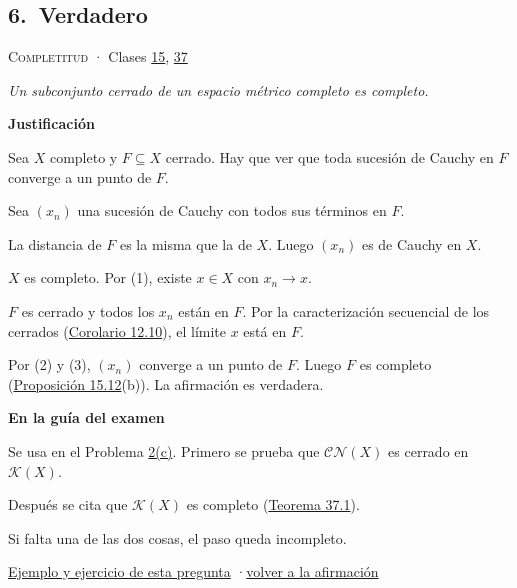 \documentclass[11pt,a4paper]{article}
\newcommand{\bloque}[1]{\par\smallskip\noindent\textbf{\color{acento}#1}\par}
\begin{document}
\subsection*{\hypertarget{r-6}{}6.\ \textcolor{ok}{Verdadero}}
{\small \textsc{Completitud} · Clases \href{https://decostruttivismo.github.io/MAT2514-repaso/pdf/MAT2514_apuntes_completos.pdf\#nameddest=section.15}{15}, \href{https://decostruttivismo.github.io/MAT2514-repaso/pdf/MAT2514_apuntes_completos.pdf\#nameddest=section.37}{37}}\par
\emph{Un subconjunto cerrado de un espacio métrico completo es completo.}
\bloque{Justificación}
\begin{pasos}
\item[] Sea $X$ completo y $F\subseteq X$ cerrado. Hay que ver que toda sucesión de Cauchy en $F$ converge a un punto de $F$.
\item[] Sea $(x_n)$ una sucesión de Cauchy con todos sus términos en $F$.
\item[(1)] La distancia de $F$ es la misma que la de $X$. Luego $(x_n)$ es de Cauchy en $X$.
\item[(2)] $X$ es completo. Por (1), existe $x\in X$ con $x_n\to x$.
\item[(3)] $F$ es cerrado y todos los $x_n$ están en $F$. Por la caracterización secuencial de los cerrados (\href{https://decostruttivismo.github.io/MAT2514-repaso/pdf/MAT2514_apuntes_completos.pdf\#nameddest=teorema.12.10}{Corolario 12.10}), el límite $x$ está en $F$.
\item[] Por (2) y (3), $(x_n)$ converge a un punto de $F$. Luego $F$ es completo (\href{https://decostruttivismo.github.io/MAT2514-repaso/pdf/MAT2514_apuntes_completos.pdf\#nameddest=teorema.15.12}{Proposición 15.12}(b)). La afirmación es verdadera.
\end{pasos}
\bloque{En la guía del examen}
\begin{pasos}
\item[] Se usa en el Problema \hyperlink{prob-2}{2(c)}. Primero se prueba que $\mathcal{CN}(X)$ es cerrado en $\mathcal K(X)$.
\item[] Después se cita que $\mathcal K(X)$ es completo (\href{https://decostruttivismo.github.io/MAT2514-repaso/pdf/MAT2514_apuntes_completos.pdf\#nameddest=teorema.37.1}{Teorema 37.1}).
\item[] Si falta una de las dos cosas, el paso queda incompleto.
\end{pasos}
\par{}
\par{\small \hyperlink{e-6}{Ejemplo y ejercicio de esta pregunta} \quad·\quad \hyperlink{q-6}{volver a la afirmación}}
\end{document}
